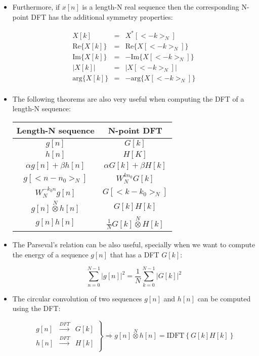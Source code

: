 \documentclass[a4paper,11pt,oneside]{article}
\begin{document}
\begin{itemize}
\item Furthermore, if $x[n]$ is a length-N real sequence then the corresponding N-point DFT has the additional symmetry properties:

\[
\begin{array}{ccc}
X[k] &=& X^*[<-k>_{N}]\\
\textrm{Re}\{X[k]\}&=&\textrm{Re}\{X[<-k>_{N}]\}\\
\textrm{Im}\{X[k]\}&=&-\textrm{Im}\{X[<-k>_{N}]\}\\
\left|X[k]\right|&=&\left|X[<-k>_N]\right|\\
\textrm{arg}\{X[k]\}&=&-\textrm{arg}\{X[<-k>_{N}]\}\\
\end{array}
\]

\item The following theorems are also very useful when computing the DFT of a length-N sequence:

\vspace{1cm}
\begin{tabular}{cc}
\hline
Length-N sequence & N-point DFT\\
\hline
$g[n]$ & $G[k]$\\
$h[n]$ & $H[K]$\\
\hline
$\alpha g[n] + \beta h[n]$ & $\alpha G[k] + \beta H[k]$\\
$g[<n-n_{0}>_{N}]$ & $W_{N}^{kn_{0}}G[k]$\\
$W_{N}^{-k_{0}n}g[n]$ & $G[<k-k_0>_N]$\\
$g[n]\stackrel{N}{\otimes}h[n]$ & $G[k]H[k]$\\
$g[n]h[n]$ & $\frac{1}{N}G[k]\stackrel{N}{\otimes}H[k]$\\
\hline
\end{tabular}
\vspace{1cm}

\item The Parseval's relation can be also useful, specially when we want to compute the energy of a sequence $g[n]$ that has a DFT $G[k]$:

\[
\sum_{n=0}^{N-1}|g[n]|^2=\frac{1}{N}\sum_{k=0}^{N-1}|G[k]|^2
\]

\item The circular convolution of two sequences $g[n]$ and $h[n]$ can be computed using the DFT:

\[
\left.
\begin{array}{lll}
g[n]&\stackrel{DFT}{\rightarrow}&G[k]\\
h[n]&\stackrel{DFT}{\rightarrow}&H[k]\\
\end{array}
\right\}
\Longrightarrow g[n]\stackrel{N}{\otimes}h[n]=\textrm{IDFT}\left\{G[k]H[k]\right\}
\]



\end{itemize}
\end{document}
